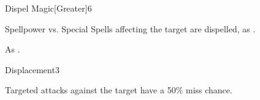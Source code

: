 \begin{spellsection}{Dispel Magic}[Greater]{6}
    \begin{spellheader}
    \end{spellheader}
    \begin{spellcontent}
        \begin{spelltargetinginfo}
        \end{spelltargetinginfo}
        \begin{spelleffects}
            \begin{spellattack}{Spellpower vs. Special}
                \spelleffect Spells affecting the target are dispelled, as .
            \end{spellattack}
        \end{spelleffects}
    \end{spellcontent}
    \begin{spellfooter}
        \spellnotes As .
        \miscastyou
    \end{spellfooter}
\end{spellsection}

\begin{spellsection}{Displacement}{3}
    \begin{spellheader}
    \end{spellheader}
    \begin{spellcontent}
        \begin{spelltargetinginfo}
        \end{spelltargetinginfo}
        \begin{spelleffects}
            \spelleffect Targeted attacks against the target have a 50\% miss chance. 
            \spelldur \durshort \dismissable
        \end{spelleffects}
    \end{spellcontent}
    \begin{spellfooter}
        \miscastrandom
    \end{spellfooter}
\end{spellsection}

